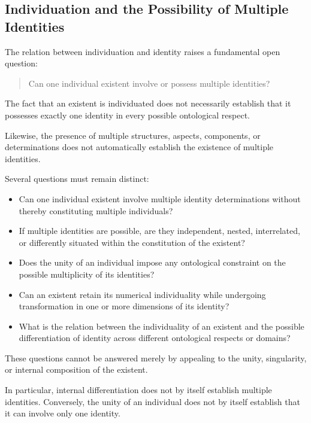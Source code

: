 \subsection{Individuation and the Possibility of Multiple Identities}

The relation between individuation and identity raises
a fundamental open question:

\begin{quote}
Can one individual existent involve or possess multiple
identities?
\end{quote}

The fact that an existent is individuated does not
necessarily establish that it possesses exactly one
identity in every possible ontological respect.

Likewise, the presence of multiple structures, aspects,
components, or determinations does not automatically
establish the existence of multiple identities.

Several questions must remain distinct:

\begin{itemize}
    \item Can one individual existent involve multiple
    identity determinations without thereby constituting
    multiple individuals?

    \item If multiple identities are possible, are they
    independent, nested, interrelated, or differently
    situated within the constitution of the existent?

    \item Does the unity of an individual impose any
    ontological constraint on the possible multiplicity
    of its identities?

    \item Can an existent retain its numerical individuality
    while undergoing transformation in one or more
    dimensions of its identity?

    \item What is the relation between the individuality
    of an existent and the possible differentiation of
    identity across different ontological respects or
    domains?
\end{itemize}

These questions cannot be answered merely by appealing
to the unity, singularity, or internal composition of
the existent.

In particular, internal differentiation does not by
itself establish multiple identities. Conversely, the
unity of an individual does not by itself establish
that it can involve only one identity.

